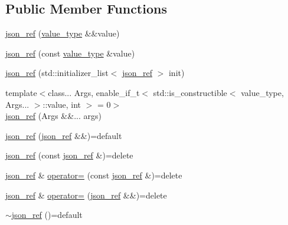 \subsection*{Public Member Functions}
\begin{DoxyCompactItemize}
\item 
\mbox{\hyperlink{classnlohmann_1_1detail_1_1json__ref_ae1adf5bcee8b6fa0c358710604fb1938}{json\+\_\+ref}} (\mbox{\hyperlink{classnlohmann_1_1detail_1_1json__ref_a78d76cf288141049568c0d670ed670ef}{value\+\_\+type}} \&\&value)
\item 
\mbox{\hyperlink{classnlohmann_1_1detail_1_1json__ref_a8c3eb3c6e952ed0cd7eece586ab4047c}{json\+\_\+ref}} (const \mbox{\hyperlink{classnlohmann_1_1detail_1_1json__ref_a78d76cf288141049568c0d670ed670ef}{value\+\_\+type}} \&value)
\item 
\mbox{\hyperlink{classnlohmann_1_1detail_1_1json__ref_adfba2db547283a7c6a5df9a32e72efc5}{json\+\_\+ref}} (std\+::initializer\+\_\+list$<$ \mbox{\hyperlink{classnlohmann_1_1detail_1_1json__ref}{json\+\_\+ref}} $>$ init)
\item 
{\footnotesize template$<$class... Args, enable\+\_\+if\+\_\+t$<$ std\+::is\+\_\+constructible$<$ value\+\_\+type, Args... $>$\+::value, int $>$  = 0$>$ }\\\mbox{\hyperlink{classnlohmann_1_1detail_1_1json__ref_a8a31d6c588d6c3c06b62008fd5d36c6c}{json\+\_\+ref}} (Args \&\&... args)
\item 
\mbox{\hyperlink{classnlohmann_1_1detail_1_1json__ref_a59221ddbd756ca24d289c787fab38dbc}{json\+\_\+ref}} (\mbox{\hyperlink{classnlohmann_1_1detail_1_1json__ref}{json\+\_\+ref}} \&\&)=default
\item 
\mbox{\hyperlink{classnlohmann_1_1detail_1_1json__ref_a4c68db46934e03588bbd73b00147c0dd}{json\+\_\+ref}} (const \mbox{\hyperlink{classnlohmann_1_1detail_1_1json__ref}{json\+\_\+ref}} \&)=delete
\item 
\mbox{\hyperlink{classnlohmann_1_1detail_1_1json__ref}{json\+\_\+ref}} \& \mbox{\hyperlink{classnlohmann_1_1detail_1_1json__ref_a98956ba676b1ae16b62346f9c4fb752e}{operator=}} (const \mbox{\hyperlink{classnlohmann_1_1detail_1_1json__ref}{json\+\_\+ref}} \&)=delete
\item 
\mbox{\hyperlink{classnlohmann_1_1detail_1_1json__ref}{json\+\_\+ref}} \& \mbox{\hyperlink{classnlohmann_1_1detail_1_1json__ref_a9a73363d9be6b300ddd30745786c50a6}{operator=}} (\mbox{\hyperlink{classnlohmann_1_1detail_1_1json__ref}{json\+\_\+ref}} \&\&)=delete
\item 
\mbox{\hyperlink{classnlohmann_1_1detail_1_1json__ref_a8bcd4cfcafe952ce5140f8cb35ebe2f6}{$\sim$json\+\_\+ref}} ()=default

\end{DoxyCompactItemize}
